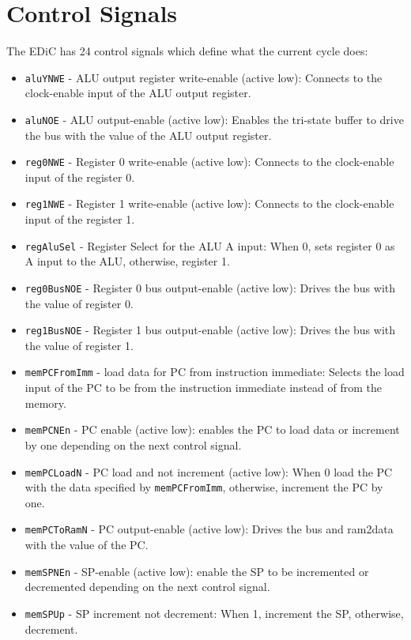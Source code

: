 \section{Control Signals}\label{sec:controlSignals}
The \gls{EDiC} has 24 control signals which define what the current cycle does:
\begin{itemize}
  \item \texttt{aluYNWE} - \gls{ALU} output register write-enable (active low): Connects to the clock-enable input of the \gls{ALU} output register.
  \item \texttt{aluNOE} - \gls{ALU} output-enable (active low): Enables the tri-state buffer to drive the bus with the value of the \gls{ALU} output register.
  \item \texttt{reg0NWE} - Register 0 write-enable (active low): Connects to the clock-enable input of the register 0.
  \item \texttt{reg1NWE} - Register 1 write-enable (active low): Connects to the clock-enable input of the register 1.
  \item \texttt{regAluSel} - Register Select for the \gls{ALU} A input: When 0, sets register 0 as A input to the \gls{ALU}, otherwise, register 1.
  \item \texttt{reg0BusNOE} - Register 0 bus output-enable (active low): Drives the bus with the value of register 0.
  \item \texttt{reg1BusNOE} - Register 1 bus output-enable (active low): Drives the bus with the value of register 1.
  \item \texttt{memPCFromImm} - load data for \gls{PC} from instruction immediate: Selects the load input of the \gls{PC} to be from the instruction immediate instead of from the memory.
  \item \texttt{memPCNEn} - \gls{PC} enable (active low): enables the \gls{PC} to load data or increment by one depending on the next control signal.
  \item \texttt{memPCLoadN} - \gls{PC} load and not increment (active low): When 0 load the \gls{PC} with the data specified by \texttt{memPCFromImm}, otherwise, increment the \gls{PC} by one.
  \item \texttt{memPCToRamN} - \gls{PC} output-enable (active low): Drives the bus and ram2data with the value of the \gls{PC}.
  \item \texttt{memSPNEn} - \gls{SP}-enable (active low): enable the \gls{SP} to be incremented or decremented depending on the next control signal.
  \item \texttt{memSPUp} - \gls{SP} increment not decrement: When 1, increment the \gls{SP}, otherwise, decrement.

\end{itemize}
